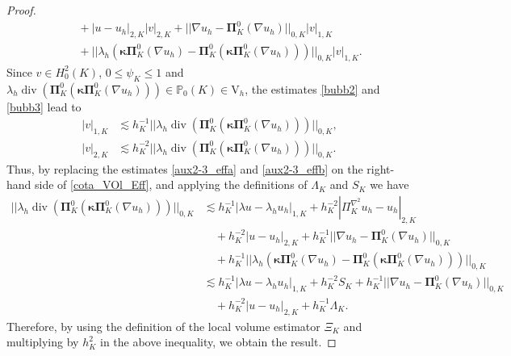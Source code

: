 \documentclass[10pt,a4paper]{amsart}
\newtheorem{comment}{Comment}
\def\bPi{\mathbf{\Pi}}
\def\bkappa{\boldsymbol{\kappa}}
\def\rV{\mathrm{V}}
\newcommand\vdiv{\mathop{\mathrm{div}}\nolimits}
\begin{document}
\begin{proof}
\begin{align}
       &\quad + |u-u_h|_{2,K}|v|_{2,K} + ||\nabla u_h - \bPi_K^0 (\nabla u_h)||_{0,K}|v|_{1,K}\nonumber\\
       &\quad + ||\lambda_h \left(\bkappa \bPi_K^0(\nabla u_h)-\bPi_K^0(\bkappa \bPi_K^0(\nabla u_h))\right) ||_{0,K}|v|_{1,K}.\label{cota_VOl_Eff}
    \end{align}
Since $v\in H_0^2(K)$, $0\leq \psi_K\leq 1$ and  $\lambda_h \vdiv\left( \bPi_K^0 (\bkappa \bPi_K^0(\nabla u_h))\right) \in \mathbb{P}_0(K)\in \rV_h$, the estimates \eqref{bubb2} and \eqref{bubb3} lead to 
\begin{subequations}
    \begin{align}
        |v|_{1,K} &\lesssim h_K^{-1}||\lambda_h \vdiv\left( \bPi_K^0 (\bkappa \bPi_K^0(\nabla u_h))\right) ||_{0,K}, \label{aux2-3_effa}\\ 
        |v|_{2,K} &\lesssim  h_K^{-2} ||\lambda_h \vdiv\left( \bPi_K^0 (\bkappa \bPi_K^0(\nabla u_h))\right) ||_{0,K}.\label{aux2-3_effb}
    \end{align}
\end{subequations}
Thus, by replacing the estimates \eqref{aux2-3_effa} and \eqref{aux2-3_effb} on the right-hand side of \eqref{cota_VOl_Eff}, and applying the definitions of $\Lambda_K$ and $S_K$ we have
\begin{align}    
||\lambda_h \vdiv\left( \bPi_K^0 (\bkappa \bPi_K^0(\nabla u_h))\right) ||_{0,K}
&\lesssim h_K^{-1}|\lambda u-\lambda_h u_h|_{1,K} + h_K^{-2}|\Pi_K^{\nabla^2} u_h-u_h|_{2,K} \nonumber\\
&\quad + h_K^{-2}|u-u_h|_{2,K} + h_K^{-1} ||\nabla u_h - \bPi_K^0 (\nabla u_h)||_{0,K} \nonumber\\
&\quad + h_K^{-1}||\lambda_h \left(\bkappa \bPi_K^0(\nabla u_h)-\bPi_K^0(\bkappa \bPi_K^0(\nabla u_h))\right) ||_{0,K} \nonumber\\
&\lesssim h_K^{-1}|\lambda u-\lambda_h u_h|_{1,K} + h_K^{-2} S_K + h_K^{-1} ||\nabla u_h - \bPi_K^0 (\nabla u_h)||_{0,K} \nonumber\\
&\quad + h_K^{-2}|u-u_h|_{2,K}  + h_K^{-1}\Lambda_K. \nonumber
\end{align}
%
Therefore, by using the definition of the local volume estimator $\Xi_K$ and multiplying by $h_K^{2}$ in the above inequality, we obtain the result.
%

\end{proof}
\end{document}
